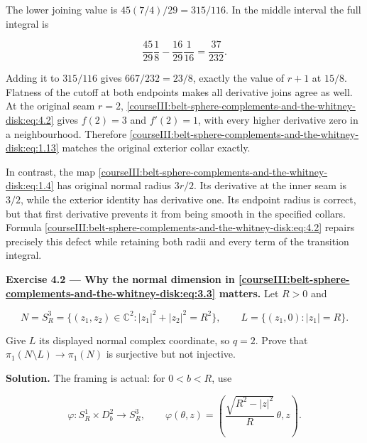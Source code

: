 The lower joining value is \(45(7/4)/29=315/116\). In the middle interval the full integral is

\begin{equation}
\frac{45}{29}\frac18-\frac{16}{29}\frac1{16}
=\frac{37}{232}.
\label{courseIII:belt-sphere-complements-and-the-whitney-disk:eq:4.3}
\end{equation}

Adding it to \(315/116\) gives \(667/232=23/8\), exactly the value of \(r+1\) at \(15/8\). Flatness of the cutoff at both endpoints makes all derivative joins agree as well. At the original seam \(r=2\), \eqref{courseIII:belt-sphere-complements-and-the-whitney-disk:eq:4.2} gives \(f(2)=3\) and \(f'(2)=1\), with every higher derivative zero in a neighbourhood. Therefore \eqref{courseIII:belt-sphere-complements-and-the-whitney-disk:eq:1.13} matches the original exterior collar exactly.

In contrast, the map \eqref{courseIII:belt-sphere-complements-and-the-whitney-disk:eq:1.4} has original normal radius \(3r/2\). Its derivative at the inner seam is \(3/2\), while the exterior identity has derivative one. Its endpoint radius is correct, but that first derivative prevents it from being smooth in the specified collars. Formula \eqref{courseIII:belt-sphere-complements-and-the-whitney-disk:eq:4.2} repairs precisely this defect while retaining both radii and every term of the transition integral.

\textbf{Exercise 4.2 --- Why the normal dimension in \eqref{courseIII:belt-sphere-complements-and-the-whitney-disk:eq:3.3} matters.} Let \(R>0\) and

\begin{equation}
N=S_R^3=\{(z_1,z_2)\in\mathbb C^2:|z_1|^2+|z_2|^2=R^2\},
\qquad
L=\{(z_1,0):|z_1|=R\}.
\label{courseIII:belt-sphere-complements-and-the-whitney-disk:eq:4.4}
\end{equation}

Give \(L\) its displayed normal complex coordinate, so \(q=2\). Prove that \(\pi_1(N\setminus L)\to\pi_1(N)\) is surjective but not injective.

\textbf{Solution.} The framing is actual: for \(0<b<R\), use

\begin{equation}
\varphi:S_R^1\times D_b^2\longrightarrow S_R^3,\qquad
\varphi(\theta,z)=
\left(\frac{\sqrt{R^2-|z|^2}}R\,\theta,z\right).
\label{courseIII:belt-sphere-complements-and-the-whitney-disk:eq:4.5}
\end{equation}

